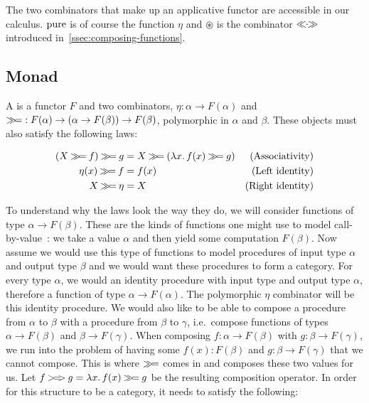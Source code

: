 The two combinators that make up an applicative functor are accessible in
our calculus. $\operatorname{pure}$ is of course the function $\eta$ and $\circledast$ is
the combinator $\mathbin{\ll\!\!\cdot\!\!\gg}$ introduced in~\ref{ssec:composing-functions}.


\subsection{Monad}
\label{ssec:monad}

\begin{definition}
  A  is a functor $F$ and two combinators,
  $\eta : \alpha \to F(\alpha)$ and
  $\mathbin{\gg\!=} : F(\alpha) \to (\alpha \to F(\beta)) \to F(\beta)$, polymorphic
  in $\alpha$ and $\beta$. These objects must also satisfy the following
  laws:

  \begin{align}
    (X \mathbin{\gg\!=} f) \mathbin{\gg\!=} g &= X \mathbin{\gg\!=} (\lambda x.\, f(x) \mathbin{\gg\!=} g) & \text{(Associativity)} \\
    \eta(x) \mathbin{\gg\!=} f &= f(x) & \text{(Left identity)} \\
    X \mathbin{\gg\!=} \eta &= X & \text{(Right identity)}
  \end{align}
\end{definition}

To understand why the laws look the way they do, we will consider functions
of type $\alpha \to F(\beta)$. These are the kinds of functions one might
use to model call-by-value~\cite{moggi1991notions,moggi1990abstract}: we
take a value $\alpha$ and then yield some computation $F(\beta)$. Now
assume we would use this type of functions to model procedures of input
type $\alpha$ and output type $\beta$ and we would want these procedures to
form a category. For every type $\alpha$, we would an identity procedure
with input type and output type $\alpha$, therefore a function of type
$\alpha \to F(\alpha)$. The polymorphic $\eta$ combinator will be this
identity procedure. We would also like to be able to compose a procedure
from $\alpha$ to $\beta$ with a procedure from $\beta$ to $\gamma$, i.e.\
compose functions of types $\alpha \to F(\beta)$ and $\beta \to
F(\gamma)$. When composing $f : \alpha \to F(\beta)$ with
$g : \beta \to F(\gamma)$, we run into the problem of having some
$f(x) : F(\beta)$ and $g : \beta \to F(\gamma)$ that we cannot
compose. This is where $\mathbin{\gg\!=}$ comes in and composes these two values for
us. Let $f \mathbin{>\!=\!\!>} g = \lambda x.\, f(x) \mathbin{\gg\!=} g$ be the resulting
composition operator. In order for this structure to be a category, it
needs to satisfy the following:

